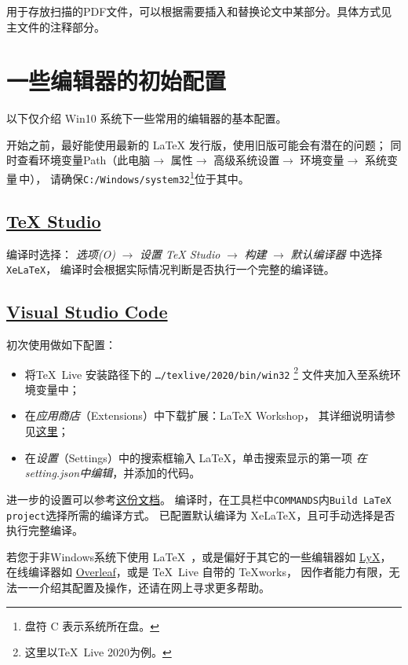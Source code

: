 \subsubsection{}
用于存放扫描的PDF文件，可以根据需要插入和替换论文中某部分。具体方式见主文件的注释部分。

\section{一些编辑器的初始配置}
以下仅介绍 Win10 系统下一些常用的编辑器的基本配置。

开始之前，最好能使用最新的 \LaTeX{} 发行版，使用旧版可能会有潜在的问题；
同时查看环境变量Path（此电脑$\to$ 属性$\to$ 高级系统设置$\to$
环境变量$\to$ 系统变量\,中），
请确保\texttt{C:/Windows/system32}\footnote{盘符 C 表示系统所在盘。}位于其中。


\subsection{\href{http://texstudio.sourceforge.net}{\TeX{} Studio}}
编译时选择\XeLaTeX{}：
\emph{选项(O)} $\to$ \emph{设置 TeX Studio} $\to$
\emph{构建} $\to$ \emph{默认编译器} 中选择\texttt{XeLaTeX}，
编译时会根据实际情况判断是否执行一个完整的编译链。

\subsection{\href{https://code.visualstudio.com}{Visual Studio Code}}
初次使用做如下配置：
\begin{itemize}
	\item 将\TeX\ Live 安装路径下的 \texttt{\dots /texlive/2020/bin/win32} \footnote{这里以\TeX\ Live 2020为例。} 文件夹加入至系统环境变量中；
	\item 在\emph{应用商店}（Extensions）中下载扩展：\textsf{LaTeX Workshop}，
			其详细说明请参见\href{https://github.com/James-Yu/LaTeX-Workshop}{这里}；%
	\item 在\emph{设置}（Settings）中的搜索框输入 LaTeX，单击搜索显示的第一项
			\emph{在setting.json中编辑}，并添加的代码。
\end{itemize}
进一步的设置可以参考\href{https://github.com/EthanDeng/vscode-latex/}{这份文档}。
编译时，在工具栏中\texttt{COMMANDS}内\texttt{Build LaTeX project}选择所需的编译方式。
已配置默认编译为 XeLaTeX，且可手动选择是否执行完整编译。

若您于非Windows系统下使用 \LaTeX\ ，或是偏好于其它的一些编辑器如 \href{http://www.lyx.org/}{LyX}，在线编译器如
\href{https://www.overleaf.com/}{Overleaf}，或是 \TeX\ Live 自带的 TeXworks，
因作者能力有限，无法一一介绍其配置及操作，还请在网上寻求更多帮助。